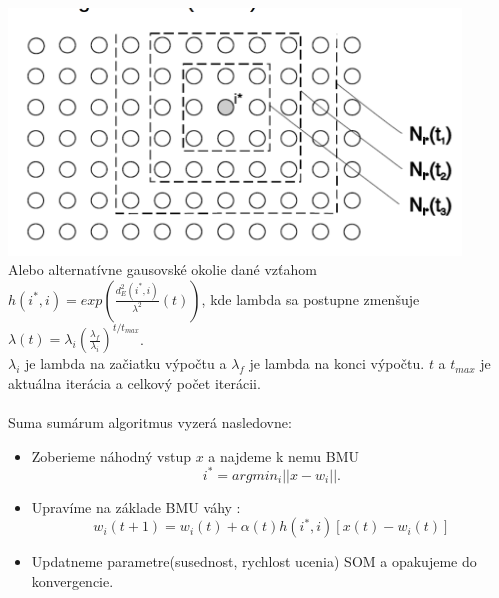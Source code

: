 \documentclass{article}
\numberwithin{equation}{section} %
\begin{document}
\includegraphics[width=12cm]{imgs/rect_neighb}\\
Alebo alternatívne gausovské okolie dané vzťahom $h(i^*, i) = exp(\frac{d^2_E(i^*, i)}{\lambda^2}(t))$, kde lambda sa postupne zmenšuje $\lambda(t) = \lambda_i(\frac{\lambda_f}{\lambda_i})^{t/t_{max}}$. \\
$\lambda_i$ je lambda na začiatku výpočtu a $\lambda_f$ je lambda na konci výpočtu. $t$ a $t_{max}$ je aktuálna iterácia a celkový počet iterácii.
\\\\
Suma sumárum algoritmus vyzerá nasledovne:
\begin{itemize}
\item Zoberieme náhodný vstup $x$ a najdeme k nemu BMU $$i^* = arg min_i ||x - w_i||.$$
\item Upravíme na základe BMU váhy : $$ w_i(t+1) = w_i(t) + \alpha(t)h(i^*,i)[x(t) - w_i(t)] $$
\item Updatneme parametre(susednost, rychlost ucenia) SOM a opakujeme do konvergencie.
\end{itemize}
\end{document}
